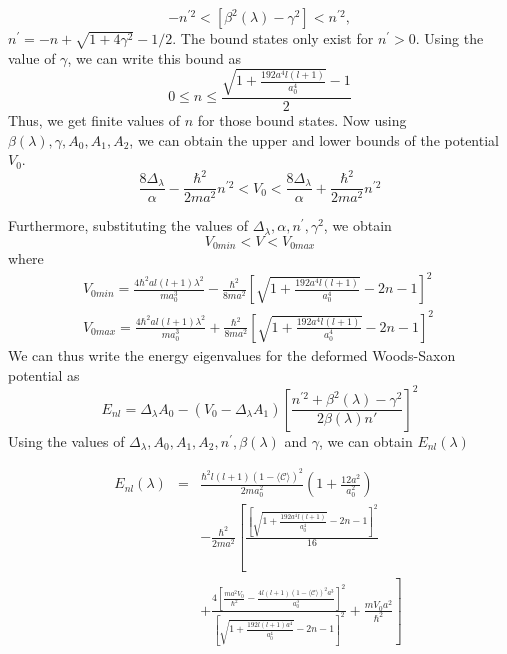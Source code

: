 \documentclass[12pt]{article}
\begin{document}
\begin{equation} \label{bound}
-n^{'2}<\left[\beta^2(\lambda)-\gamma^2\right]<n^{'2}, 
\end{equation} 
$n^{'}= -n + {\sqrt{1+4\gamma^2}-1}/{2}
$. 
The bound states only exist for $n^{'} > 0$. Using the value of $\gamma $, we can   
 write this bound as 
\begin{equation} \label{con_n2}
0 \le n\le \frac{\sqrt{1+\frac{192a^4l(l+1)}{a_0^4}}-1}{2}
\end{equation}
Thus, we get finite values of  $n$ for those  bound states. Now using   $\beta (\lambda),\gamma,A_0,A_1,A_2 $, we can  obtain  the upper and lower bounds of the potential $ V_0$.
\begin{equation} 
	\frac{8\Delta_{\lambda}}{\alpha}-\frac{\hbar^2}{2m a^2} n^{'2}<V_0<\frac{8\Delta_{\lambda}}{\alpha}+\frac{\hbar^2}{2m a^2}n^{'2} 
\end{equation}

Furthermore,  substituting the values of $\Delta_{\lambda} ,\alpha,n^{'},\gamma^2$, we obtain 
\begin{equation}
    V_{0min} < V < V_{0max}
\end{equation}
where 
\begin{eqnarray}
V_{0min}=\frac{4\hbar^2 a l(l+1)\lambda^2}{m a_0^3}-\frac{\hbar^2}{8m a^2}\left[\sqrt{1+\frac{192a^4l(l+1)}{a_0^4}}-2n-1\right]^2 ~\label{V0min_def}
\\
V_{0max}=\frac{4\hbar^2 a l(l+1)\lambda^2}{m a_0^3}+\frac{\hbar^2}{8m a^2}\left[\sqrt{1+\frac{192a^4l(l+1)}{a_0^4}}-2n-1\right]^2 ~\label{V0max_def}
\end{eqnarray}
We can thus write the  energy eigenvalues for the deformed Woods-Saxon potential as 
\begin{equation} \label{Enl1}
	E_{nl}=\Delta_\lambda A_0-(V_0-\Delta_\lambda A_1)\left[\frac{n^{'2}+\beta^2(\lambda)-\gamma^2}{2\beta(\lambda) n{'}}\right]^2
\end{equation}
Using  the values of $\Delta_\lambda,A_0,A_1,A_2,n^{'},\beta(\lambda)$ and $\gamma$, we  can  obtain $E_{nl}(\lambda)$  

\begin{eqnarray}
E_{nl}(\lambda)   &=&\frac{\hbar^2 l(l+1)(1-\mathcal{\langle C\rangle})^2}{2m a_0^2}\left(1+\frac{12a^2}{a_0^2}\right) \nonumber \\ && -\frac{\hbar^2}{2m a^2}\left[\frac{\left[\sqrt{1+\frac{192a^4l(l+1)}{a_0^4}}-2n-1\right]^2}{16} \right. \\ \nonumber && \left.   +\frac{4\left[\frac{m a^2 V_0}{\hbar^2}-\frac{4l(l+1)(1-\mathcal{\langle C\rangle})^2a^3}{a_0^3}\right]^2}{\left[\sqrt{1+\frac{192l(l+1)a^4}{a_0^4}}-2n-1\right]^2}+\frac{m V_0 a^2}{\hbar^2}\right] ~\label{eigenval_final}
\end{eqnarray}
\end{document}

